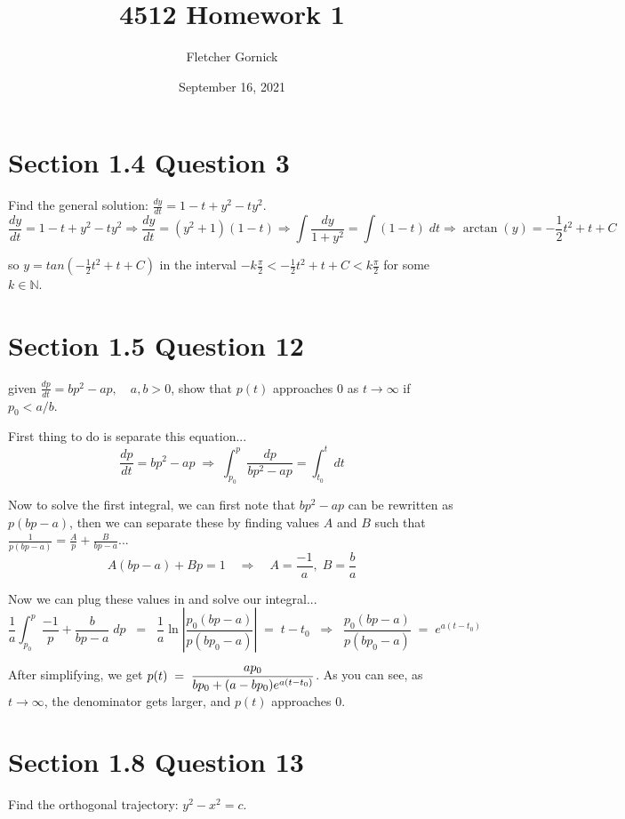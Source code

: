 \documentclass[11pt]{article}
\title{4512 Homework 1}
\author{Fletcher Gornick}
\date{September 16, 2021}
\begin{document}
 \maketitle 

 \section*{Section 1.4 Question 3}
 Find the general solution: $\frac{dy}{dt} = 1 - t + y^2 - ty^2$.
 $$\frac{dy}{dt} = 1 - t + y^2 - ty^2 \Rightarrow
 \frac{dy}{dt} = (y^2+1)(1-t) \Rightarrow
 \int \frac{dy}{1+y^2} = \int (1-t) \; dt \Rightarrow
 \arctan(y) = -\frac{1}{2}t^2+t+C$$

 so $y = tan(-\frac{1}{2}t^2+t+C)$ in the interval 
 $-k \frac{\pi}{2} < -\frac{1}{2}t^2+t+C < k \frac{\pi}{2}$
 for some $k \in \mathbb{N}$.

 \section*{Section 1.5 Question 12}
 given $\frac{dp}{dt} = bp^2 - ap, \quad a,b > 0$, show that 
 $p(t)$ approaches $0$ as $t \rightarrow \infty$ if $p_0 < a/b$.

 First thing to do is separate this equation...
$$\frac{dp}{dt}=bp^2-ap \; \Rightarrow \; \int_{p_0}^{p} \frac{dp}{bp^2-ap} = 
\int_{t_0}^{t} dt$$

Now to solve the first integral, we can first note that $bp^2-ap$ can be rewritten as
$p(bp-a)$, then we can separate these by finding values $A$ and $B$ such that
$\frac{1}{p(bp-a)} = \frac{A}{p} + \frac{B}{bp-a}$...
$$A(bp-a)+Bp = 1 \quad \Rightarrow \quad A = \frac{-1}{a}, \; B = \frac{b}{a}$$

Now we can plug these values in and solve our integral...
$$\frac{1}{a} \int_{p_0}^{p} \frac{-1}{p} + \frac{b}{bp-a} \; dp \;\; = \;\;
\frac{1}{a}\ln{\left|\frac{p_0(bp-a)}{p(bp_0-a)}\right|} \;=\; t-t_0 \;\; \Rightarrow
\;\; \frac{p_0(bp-a)}{p(bp_0-a)} \; = \; e^{a(t-t_0)} $$

After simplifying, we get 
$\mathlarger{p(t) \;=\; \frac{ap_0}{bp_0 + (a-bp_0)e^{a(t-t_0)}}}$.  As you can see,
as $t \rightarrow \infty$, the denominator gets larger, and $p(t)$ approaches 0.

 \section*{Section 1.8 Question 13}
 Find the orthogonal trajectory: $y^2 - x^2 = c$.
\end{document}

